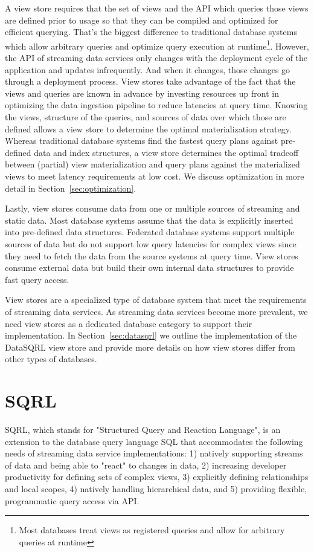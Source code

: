 \documentclass[	DIV=calc,%
							paper=letter,%
							fontsize=11pt,%
							twocolumn]{scrartcl}	 					%
\begin{document}
A view store requires that the set of views and the API which queries those views are defined prior to usage so that they can be compiled and optimized for efficient querying. That's the biggest difference to traditional database systems which allow arbitrary queries and optimize query execution at runtime\footnote{Most databases treat views as registered queries and allow for arbitrary queries at runtime}. However, the API of streaming data services only changes with the deployment cycle of the application and updates infrequently. And when it changes, those changes go through a deployment process. View stores take advantage of the fact that the views and queries are known in advance by investing resources up front in optimizing the data ingestion pipeline to reduce latencies at query time. Knowing the views, structure of the queries, and sources of data over which those are defined allows a view store to determine the optimal materialization strategy. Whereas traditional database systems find the fastest query plans against pre-defined data and index structures, a view store determines the optimal tradeoff between (partial) view materialization and query plans against the materialized views to meet latency requirements at low cost. We discuss optimization in more detail in Section~\ref{sec:optimization}.

Lastly, view stores consume data from one or multiple sources of streaming and static data. Most database systems assume that the data is explicitly inserted into pre-defined data structures. Federated database systems support multiple sources of data but do not support low query latencies for complex views since they need to fetch the data from the source systems at query time. View stores consume external data but build their own internal data structures to provide fast query access.

View stores are a specialized type of database system that meet the requirements of streaming data services. As streaming data services become more prevalent, we need view stores as a dedicated database category to support their implementation.
In Section~\ref{sec:datasqrl} we outline the implementation of the DataSQRL view store and provide more details on how view stores differ from other types of databases.

\section{SQRL}
\label{sec:sqrl}

SQRL, which stands for "Structured Query and Reaction Language", is an extension to the database query language SQL that accommodates the following needs of streaming data service implementations: 1) natively supporting streams of data and being able to "react" to changes in data, 2) increasing developer productivity for defining sets of complex views, 3) explicitly defining relationships and local scopes, 4) natively handling hierarchical data, and 5) providing flexible, programmatic query access via API.
\end{document}
